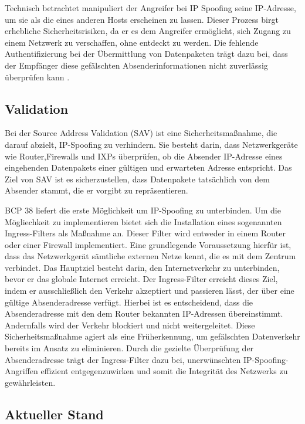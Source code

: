 \documentclass[sigplan,screen]{acmart}
\begin{document}
Technisch betrachtet manipuliert der Angreifer bei IP Spoofing seine IP-Adresse, um sie als die eines anderen Hosts erscheinen zu lassen. Dieser Prozess birgt erhebliche Sicherheitsrisiken, da er es dem Angreifer ermöglicht, sich Zugang zu einem Netzwerk zu verschaffen, ohne entdeckt zu werden. Die fehlende Authentifizierung bei der Übermittlung von Datenpaketen trägt dazu bei, dass der Empfänger diese gefälschten Absenderinformationen nicht zuverlässig überprüfen kann \cite{Beverly01}.


\subsection{Validation}
Bei der Source Address Validation (SAV) ist eine Sicherheitsmaßnahme, die darauf abzielt, IP-Spoofing zu verhindern. Sie besteht darin, dass Netzwerkgeräte wie Router,Firewalls und IXPs überprüfen, ob die Absender IP-Adresse eines eingehenden Datenpakets einer gültigen und erwarteten Adresse entspricht. Das Ziel von SAV ist es sicherzustellen, dass Datenpakete tatsächlich von dem Absender stammt, die er vorgibt zu repräsentieren.

BCP 38 \cite{Ingress01} liefert die erste Möglichkeit um IP-Spoofing zu unterbinden. Um die Mögliechkeit zu implementieren bietet sich die Installation eines sogenannten Ingress-Filters als Maßnahme an. Dieser Filter wird entweder in einem Router oder einer Firewall implementiert. Eine grundlegende Voraussetzung hierfür ist, dass das Netzwerkgerät sämtliche externen Netze kennt, die es mit dem Zentrum verbindet. Das Hauptziel besteht darin, den Internetverkehr zu unterbinden, bevor er das globale Internet erreicht.
Der Ingress-Filter erreicht dieses Ziel, indem er ausschließlich den Verkehr akzeptiert und passieren lässt, der über eine gültige Absenderadresse verfügt. Hierbei ist es entscheidend, dass die Absenderadresse mit den dem Router bekannten IP-Adressen übereinstimmt. Andernfalls wird der Verkehr blockiert und nicht weitergeleitet.
Diese Sicherheitsmaßnahme agiert als eine Früherkennung, um gefälschten Datenverkehr bereits im Ansatz zu eliminieren. Durch die gezielte Überprüfung der Absenderadresse trägt der Ingress-Filter dazu bei, unerwünschten IP-Spoofing-Angriffen effizient entgegenzuwirken und somit die Integrität des Netzwerks zu gewährleisten.



\subsection{Aktueller Stand}
\end{document}
